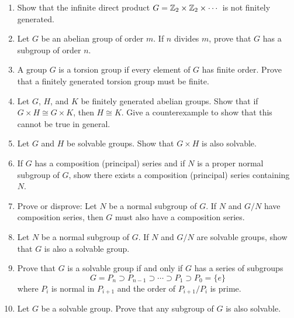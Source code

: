 {\begin{enumerate}
 
 
\bf\item\rm  %
Show that the infinite direct product $G = {\Bbb Z}_2 \times {\Bbb
Z}_2 \times \cdots$ is not finitely generated.
 
 
 
\bf\item\rm
Let $G$ be an abelian group of order $m$.  If $n$ divides $m$, prove
that $G$ has a subgroup of order $n$.
 
\bf\item\rm
A group $G$ is a {\bfi torsion group\/} if every 
element of $G$ has finite order.  Prove that a finitely generated 
torsion group must be finite.
 
\bf\item\rm
Let $G$, $H$, and $K$ be finitely generated abelian
groups. Show that if $G \times H \cong G \times K$, then $H
\cong K$.  Give a counterexample to show that this cannot be
true in general.
 
 
\bf\item\rm
Let $G$ and $H$ be solvable groups.  Show that $G \times H$ is also
solvable.
 
 
\bf\item\rm
If $G$ has a composition (principal) series and if $N$ is a
proper normal subgroup of $G$, show there exists a
composition (principal) series containing $N$.
 
 
 
\bf\item\rm
Prove or disprove:
Let $N$ be a normal subgroup of $G$.  If $N$ and $G/N$ have
composition series, then $G$ must also have a composition series.
 
\bf\item\rm
Let $N$ be a normal subgroup of $G$.  If $N$ and $G/N$ are solvable
groups, show that $G$ is also a solvable group.
 
\bf\item\rm
Prove that $G$ is a solvable group if and only if $G$ has a series of
subgroups
\[
G = P_n \supset P_{n-1} \supset \cdots \supset P_1 \supset P_0 = \{ e \}
\]
where $P_i$ is normal in $P_{i+1}$ and the order of $P_{i+1} / P_i$ is
prime. 
 
\bf\item\rm
Let $G$ be a solvable group.  Prove that any subgroup of $G$ is also
solvable.
 

\end{enumerate}}
